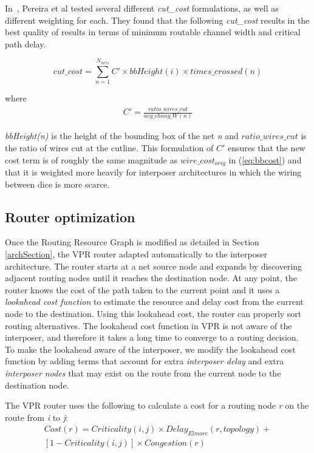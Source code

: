 \documentclass{sig-alternate-2013}
\begin{document}
In~\cite{hahn2014cad}, Pereira et al tested several different \textit{cut\_cost} formulations, as well as different weighting for each. They found that the following \textit{cut\_cost} results in the best quality of results in terms of minimum routable channel width and critical path delay.

\begin{equation} \label{eq:cost2}
cut\_cost = \sum_{n=1}^{N_{nets}} C' \times bbHeight(i) \times times\_crossed(n)
\end{equation}

where 
\begin{equation} \label{eq:cprime}
\begin{split}
C' = \frac{ratio\_wires\_cut}{avg\_chany\_W(n)}
\end{split}
\end{equation}

\textit{bbHeight(n)} is the height of the bounding box of the net \textit{n} and $ratio\_wires\_cut$ is the ratio of wires cut at the cutline. This formulation of $C'$ ensures that the new cost term is of roughly the same magnitude as $wire\_cost_{orig}$ in (\ref{eq:bbcost}) and that it is weighted more heavily for interposer architectures in which the wiring between dice is more scarce.

\subsection{Router optimization}
\label{sec:router_optimizations}
Once the Routing Resource Graph is modified as detailed in Section \ref{archSection}, the VPR router adapted automatically to the interposer architecture. The router starts at a net source node and expands by discovering adjacent routing nodes until it reaches the destination node. At any point, the router knows the cost of the path taken to the current point and it uses a \textit{lookahead cost function} to estimate the resource and delay cost from the current node to the destination. Using this lookahead cost, the router can properly sort routing alternatives. The lookahead cost function in VPR is not aware of the interposer, and therefore it takes a long time to converge to a routing decision. To make the lookahead aware of the interposer, we modify the lookahead cost function by adding terms that account for extra \textit{interposer delay} and extra \textit{interposer nodes} that may exist on the route from the current node to the destination node.

The VPR router uses the following to calculate a cost for a routing node \textit{r} on the route from \textit{i} to \textit{j}:
\begin{equation} \label{eq:routing_cost}
\begin{split}
Cost(r) = Criticality(i,j) \times Delay_{Elmore}(r, topology) + \\ [1-Criticality(i,j)] \times Congestion(r)
\end{split}
\end{equation}
\end{document}
